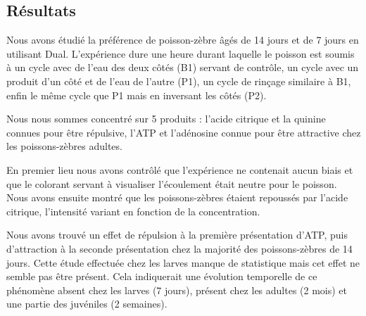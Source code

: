 \subsection*{Résultats}
Nous avons étudié la préférence de poisson-zèbre âgés de 14 jours et de 7 jours en utilisant Dual. L'expérience dure une heure durant laquelle le poisson est soumis à un cycle avec de l'eau des deux côtés (B1) servant de contrôle, un cycle avec un produit d'un côté et de l'eau de l'autre (P1), un cycle de rinçage similaire à B1, enfin le même cycle que P1 mais en inversant les côtés (P2).

Nous nous sommes concentré sur 5 produits : l'acide citrique et la quinine connues pour être répulsive, l'ATP et l'adénosine connue pour être attractive chez les poissons-zèbres adultes.

En premier lieu nous avons contrôlé que l'expérience ne contenait aucun biais et que le colorant servant à visualiser l'écoulement était neutre pour le poisson. Nous avons ensuite montré que les poissons-zèbres étaient repoussés par l'acide citrique, l'intensité variant en fonction de la concentration.

Nous avons trouvé un effet de répulsion à la première présentation d'ATP, puis d'attraction à la seconde présentation chez la majorité des poissons-zèbres de 14 jours. Cette étude effectuée chez les larves manque de statistique mais cet effet ne semble pas être présent. Cela indiquerait une évolution temporelle de ce phénomène absent chez les larves (7 jours), présent chez les adultes (2 mois) et une partie des juvéniles (2 semaines).
